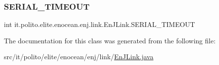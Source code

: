 \subsubsection{\texorpdfstring{S\+E\+R\+I\+A\+L\+\_\+\+T\+I\+M\+E\+O\+UT}{SERIAL\_TIMEOUT}}
{\footnotesize\ttfamily int it.\+polito.\+elite.\+enocean.\+enj.\+link.\+En\+J\+Link.\+S\+E\+R\+I\+A\+L\+\_\+\+T\+I\+M\+E\+O\+UT\hspace{0.3cm}{\ttfamily [static]}}



The documentation for this class was generated from the following file\+:\begin{DoxyCompactItemize}
\item 
src/it/polito/elite/enocean/enj/link/\hyperlink{_en_j_link_8java}{En\+J\+Link.\+java}\end{DoxyCompactItemize}
